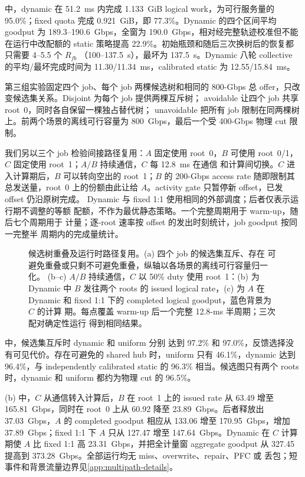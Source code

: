  中，dynamic 在 51.2~ms 内完成 1.133~GiB
logical work，为可行服务量的 95.0\%；fixed quota 完成 0.921~GiB，即
77.3\%。Dynamic 的四个区间平均 goodput 为 189.3--190.6~Gbps，全窗为
190.0~Gbps，相对经完整轨迹校准但不能在运行中改配额的 static 策略提高
22.9\%。初始瓶颈和随后三次换树后的恢复都只需要 4--5.5 个 $R_{fb}$
（100--137.5~\textmu s），最坏为 137.5~\textmu s。Dynamic 八轮
collective 的平均/最坏完成时间为 11.30/11.34~ms，calibrated static 为
12.55/15.84~ms。

第三组实验固定四个 job、每个 job 两棵候选树和相同的 800-Gbps 总
offer，只改变候选集关系。Disjoint 为每个 job 提供两棵互斥树；
avoidable 让四个 job 共享 root~0，同时各自保留一棵独占替代树；
unavoidable 把所有 job 限制在同两棵树上。前两个场景的离线可行容量为
800~Gbps，最后一个受 400-Gbps 物理 cut 限制。

我们另以三个 job 检验间接路径复用：$A$ 固定使用 root~0，$B$ 可使用
root~0/1，$C$ 固定使用 root~1；$A/B$ 持续通信，$C$ 每 12.8~ms 在通信
和计算间切换。$C$ 进入计算期后，$B$ 可以转向空出的 root~1；$B$ 的
200-Gbps access rate 随即限制其总发送量，root~0 上的份额由此让给
$A$。activity gate 只暂停新 offset，已发 offset 仍沿原树完成。
Dynamic 与 fixed 1:1 使用相同的外部调度；后者仅表示运行期不调整的等额
配额，不作为最优静态策略。一个完整周期用于 warm-up，随后七个周期用于
计量；逐-root 速率按 offset 的发出时刻统计，job goodput 按同一完整半
周期内的完成量统计。

\begin{figure}[t]
\centering

\caption{候选树重叠及运行时路径复用。(a) 四个 job 的候选集互斥、存在
可避免重叠或只剩不可避免重叠，纵轴以各场景的离线可行容量归一化。
(b--c) $A/B$ 持续通信，$C$ 以 50\% duty 使用 root~1：(b) 为 Dynamic
中 $B$ 发往两个 roots 的 issued logical rate，(c) 为 $A$ 在 Dynamic
和 fixed 1:1 下的 completed logical goodput，蓝色背景为 $C$ 的计算
期。每点覆盖 warm-up 后一个完整 12.8-ms 半周期；三次配对确定性运行
得到相同结果。}
\label{fig:multipath-overlap}
\end{figure}

 中，候选集互斥时 dynamic 和 uniform 分别
达到 97.2\% 和 97.0\%，反馈选择没有可见代价。存在可避免的 shared
hub 时，uniform 只有 46.1\%，dynamic 达到 96.4\%，与 independently
calibrated static 的 96.3\% 相当。候选图只有两个 roots 时，dynamic 和
uniform 都约为物理 cut 的 96.5\%。

(b) 中，$C$ 从通信转入计算后，$B$ 在
root~1 上的 issued rate 从 63.49 增至 165.81~Gbps，同时在 root~0 上从
60.92 降至 23.89~Gbps。后者释放出 37.03~Gbps，$A$ 的 completed
goodput 相应从 133.06 增至 170.95~Gbps，增加 37.89~Gbps；fixed 1:1
下 $A$ 只从 127.47 增至 147.64~Gbps。Dynamic 在 $C$ 计算期使 $A$ 比
fixed 1:1 高 23.31~Gbps，并把全计量窗 aggregate goodput 从 327.45
提高到 373.28~Gbps。全部运行均无 miss、overwrite、repair、PFC 或
丢包；短事件和背景流量边界见\cref{app:multipath-details}。

